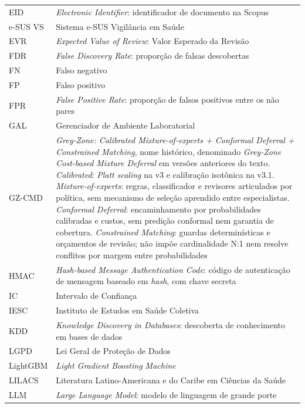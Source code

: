 \begin{longtable}{@{}l@{\hspace{1.5em}}p{12cm}@{}}
EID      & \textit{Electronic Identifier}: identificador de documento na Scopus \\[6pt]
e-SUS VS & Sistema e-SUS Vigil\^{a}ncia em Sa\'{u}de \\[6pt]
EVR      & \textit{Expected Value of Review}: Valor Esperado da Revis\~{a}o \\[6pt]
FDR      & \textit{False Discovery Rate}: proporção de falsas descobertas \\[6pt]
FN & Falso negativo \\[6pt]
FP & Falso positivo \\[6pt]
FPR & \textit{False Positive Rate}: proporção de falsos positivos entre os não pares \\[6pt]
GAL      & Gerenciador de Ambiente Laboratorial \\[6pt]
GZ-CMD   & \textit{Grey-Zone: Calibrated Mixture-of-experts + Conformal Deferral + Constrained Matching}, nome histórico, denominado \textit{Grey-Zone Cost-based Mixture Deferral} em versões anteriores do texto. \textit{Calibrated}: \textit{Platt scaling} na v3 e calibração isotônica na v3.1. \textit{Mixture-of-experts}: regras, classificador e revisores articulados por política, sem mecanismo de seleção aprendido entre especialistas. \textit{Conformal Deferral}: encaminhamento por probabilidades calibradas e custos, sem predição conformal nem garantia de cobertura. \textit{Constrained Matching}: guardas determinísticas e orçamentos de revisão; não impõe cardinalidade N:1 nem resolve conflitos por margem entre probabilidades \\[6pt]
HMAC     & \textit{Hash-based Message Authentication Code}: c\'{o}digo de autentica\c{c}\~{a}o de mensagem baseado em \textit{hash}, com chave secreta \\[6pt]
IC       & Intervalo de Confian\c{c}a \\[6pt]
IESC     & Instituto de Estudos em Sa\'{u}de Coletiva \\[6pt]
KDD      & \textit{Knowledge Discovery in Databases}: descoberta de conhecimento em bases de dados \\[6pt]
LGPD     & Lei Geral de Prote\c{c}\~{a}o de Dados \\[6pt]
LightGBM & \textit{Light Gradient Boosting Machine} \\[6pt]
LILACS   & Literatura Latino-Americana e do Caribe em Ci\^{e}ncias da Sa\'{u}de \\[6pt]
LLM      & \textit{Large Language Model}: modelo de linguagem de grande porte \\[6pt]

\end{longtable}
